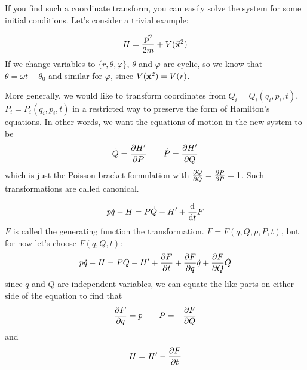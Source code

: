 \documentclass[a4paper,twoside,master.tex]{subfiles}
\begin{document}
If you find such a coordinate transform, you can easily solve the system for some initial conditions. Let's consider a trivial example:

\begin{ex}
    \begin{equation}
        H = \frac{\va{p}^2}{2m} + V(\va{x}^2)
    \end{equation}
    If we change variables to $ \{r, \theta, \varphi\} $, $ \theta $ and $ \varphi $ are cyclic, so we know that $ \theta = \omega t + \theta_0 $ and similar for $ \varphi $, since $ V(\va{x}^2) = V(r) $.
\end{ex}

More generally, we would like to transform coordinates from $ Q_i = Q_i(q_i,p_i,t) $, $ P_i = P_i(q_i, p_i, t) $ in a restricted way to preserve the form of Hamilton's equations. In other words, we want the equations of motion in the new system to be
\begin{equation}
    \dot{Q} = \pdv{H'}{P} \qquad \dot{P} = \pdv{H'}{Q}
\end{equation}
which is just the Poisson bracket formulation with $ \pdv{Q}{Q}= \pdv{P}{P}= 1 $. Such transformations are called canonical.

\begin{equation}
    p \dot{q} - H = P\dot{Q} - H' + \dv{t}F
\end{equation}
$ F $ is called the generating function the transformation. $ F = F(q,Q,p,P,t) $, but for now let's choose $ F(q,Q,t) $:
\begin{equation}
    p\dot{q} - H = P\dot{Q} - H' + \pdv{F}{t} + \pdv{F}{q}\dot{q} + \pdv{F}{Q} \dot{Q}
\end{equation}
since $ q $ and $ Q $ are independent variables, we can equate the like parts on either side of the equation to find that
\begin{equation}
    \pdv{F}{q} = p \qquad P = - \pdv{F}{Q}
\end{equation}
and
\begin{equation}
    H = H' - \pdv{F}{t}
\end{equation}
\end{document}
